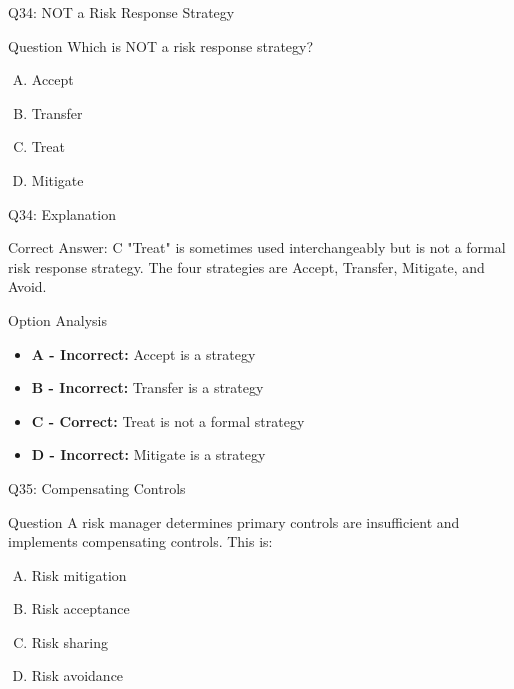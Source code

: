 \documentclass{beamer}
\begin{document}
	\begin{frame}{Q34: NOT a Risk Response Strategy}
		\begin{block}{Question}
			Which is NOT a risk response strategy?
		\end{block}
		\begin{enumerate}[(A)]
			\item Accept
			\item Transfer
			\item Treat
			\item Mitigate
		\end{enumerate}
	\end{frame}
	
	\begin{frame}{Q34: Explanation}
		\begin{block}{Correct Answer: C}
			"Treat" is sometimes used interchangeably but is not a formal risk response strategy. The four strategies are Accept, Transfer, Mitigate, and Avoid.
		\end{block}
		\begin{block}{Option Analysis}
			\begin{itemize}
				\item \textbf{A - Incorrect:} Accept is a strategy
				\item \textbf{B - Incorrect:} Transfer is a strategy
				\item \textbf{C - Correct:} Treat is not a formal strategy
				\item \textbf{D - Incorrect:} Mitigate is a strategy
			\end{itemize}
		\end{block}
	\end{frame}
	
	\begin{frame}{Q35: Compensating Controls}
		\begin{block}{Question}
			A risk manager determines primary controls are insufficient and implements compensating controls. This is:
		\end{block}
		\begin{enumerate}[(A)]
			\item Risk mitigation
			\item Risk acceptance
			\item Risk sharing
			\item Risk avoidance
		\end{enumerate}
	\end{frame}
	
\end{document}
